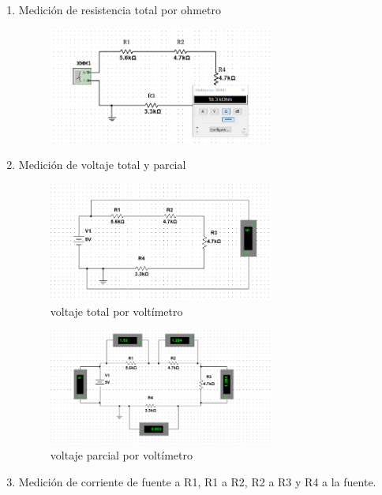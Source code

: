 \documentclass[letterpaper,12pt]{article}
\begin{document}
\begin{sloppypar}
\begin{enumerate}
    \item Medición de resistencia total por ohmetro
    \begin{figure}[H]
        \centering
        \includegraphics[width=0.7\textwidth]{images/proytec/srt.png}
    \end{figure}
\newpage
    \item Medición de voltaje total y parcial
    \begin{figure}[H]
        \centering
        \includegraphics[width=0.7\textwidth]{images/proytec/svt.png}
        \caption{voltaje total por voltímetro}
    \end{figure}
    \begin{figure}[H]
        \centering
        \includegraphics[width=0.7\textwidth]{images/proytec/svp.png}
        \caption{voltaje parcial por voltímetro}
    \end{figure}
    \item Medición de corriente de fuente a R1, R1 a R2, R2 a R3 y R4 a la fuente. 
    \begin{figure}[H]

\end{figure}
\end{enumerate}
\end{sloppypar}
\end{document}
